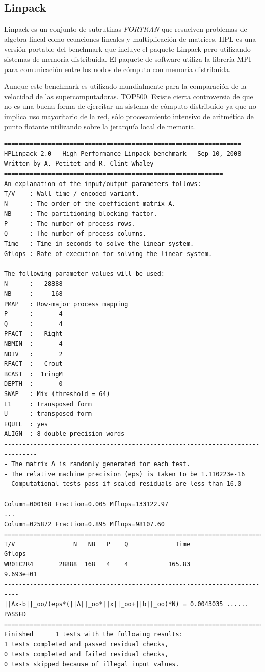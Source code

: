 \documentclass[a4paper]{report}
\begin{document}
\subsection{Linpack}

Linpack \cite{linpack} es un conjunto de subrutinas {\it FORTRAN} que resuelven
problemas de algebra lineal como ecuaciones lineales y multiplicaci\'on de
matrices. HPL \cite{hpl} es una versi\'on portable del benchmark que incluye
el paquete Linpack pero utilizando sistemas de memoria distribu\'ida. El
paquete de software utiliza la librer\'ia MPI para comunicaci\'on entre los
 nodos de c\'omputo con memoria distribu\'ida.

\bigskip

Aunque este benchmark es utilizado mundialmente para la comparaci\'on de la
velocidad de las supercomputadoras. TOP500. Existe cierta controversia de que
no es una buena forma de ejercitar un sistema de c\'omputo distribu\'ido ya
que no implica uso mayoritario de la red, s\'olo procesamiento intensivo de
aritm\'etica de punto flotante utilizando sobre la jerarqu\'ia local de
memoria.

\begin{verbatim}
=================================================================
HPLinpack 2.0 - High-Performance Linpack benchmark - Sep 10, 2008
Written by A. Petitet and R. Clint Whaley
============================================================
An explanation of the input/output parameters follows:
T/V    : Wall time / encoded variant.
N      : The order of the coefficient matrix A.
NB     : The partitioning blocking factor.
P      : The number of process rows.
Q      : The number of process columns.
Time   : Time in seconds to solve the linear system.
Gflops : Rate of execution for solving the linear system.

The following parameter values will be used:
N      :   28888
NB     :     168
PMAP   : Row-major process mapping
P      :       4
Q      :       4
PFACT  :   Right
NBMIN  :       4
NDIV   :       2
RFACT  :   Crout
BCAST  :  1ringM
DEPTH  :       0
SWAP   : Mix (threshold = 64)
L1     : transposed form
U      : transposed form
EQUIL  : yes
ALIGN  : 8 double precision words
-------------------------------------------------------------------------------
- The matrix A is randomly generated for each test.
- The relative machine precision (eps) is taken to be 1.110223e-16
- Computational tests pass if scaled residuals are less than 16.0

Column=000168 Fraction=0.005 Mflops=133122.97
...
Column=025872 Fraction=0.895 Mflops=98107.60
==========================================================================
T/V                N   NB   P    Q             Time                 Gflops
WR01C2R4       28888  168   4    4           165.83              9.693e+01
--------------------------------------------------------------------------
||Ax-b||_oo/(eps*(||A||_oo*||x||_oo+||b||_oo)*N) = 0.0043035 ...... PASSED
==========================================================================
Finished      1 tests with the following results:
1 tests completed and passed residual checks,
0 tests completed and failed residual checks,
0 tests skipped because of illegal input values.
\end{verbatim}
\end{document}

